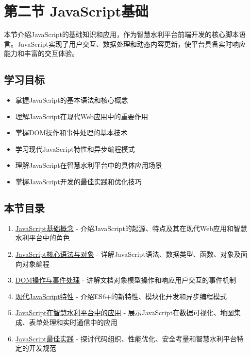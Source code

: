 \section{第二节
JavaScript基础}\label{ux7b2cux4e8cux8282-javascriptux57faux7840}

本节介绍JavaScript的基础知识和应用，作为智慧水利平台前端开发的核心脚本语言。JavaScript实现了用户交互、数据处理和动态内容更新，使平台具备实时响应能力和丰富的交互体验。

\subsection{学习目标}\label{ux5b66ux4e60ux76eeux6807}

\begin{itemize}
\tightlist
\item
  掌握JavaScript的基本语法和核心概念
\item
  理解JavaScript在现代Web应用中的重要作用
\item
  掌握DOM操作和事件处理的基本技术
\item
  学习现代JavaScript特性和异步编程模式
\item
  理解JavaScript在智慧水利平台中的具体应用场景
\item
  掌握JavaScript开发的最佳实践和优化技巧
\end{itemize}

\subsection{本节目录}\label{ux672cux8282ux76eeux5f55}

\begin{enumerate}
\def\labelenumi{\arabic{enumi}.}
\tightlist
\item
  \href{section04-02-01.md}{JavaScript基础概念} -
  介绍JavaScript的起源、特点及其在现代Web应用和智慧水利平台中的角色
\item
  \href{section04-02-02.md}{JavaScript核心语法与对象} -
  详解JavaScript语法、数据类型、函数、对象及面向对象编程
\item
  \href{section04-02-03.md}{DOM操作与事件处理} -
  讲解文档对象模型操作和响应用户交互的事件机制
\item
  \href{section04-02-04.md}{现代JavaScript特性} -
  介绍ES6+的新特性、模块化开发和异步编程模式
\item
  \href{section04-02-05.md}{JavaScript在智慧水利平台中的应用} -
  展示JavaScript在数据可视化、地图集成、表单处理和实时通信中的应用
\item
  \href{section04-02-06.md}{JavaScript最佳实践} -
  探讨代码组织、性能优化、安全考量和智慧水利平台特定的开发规范
\end{enumerate}

